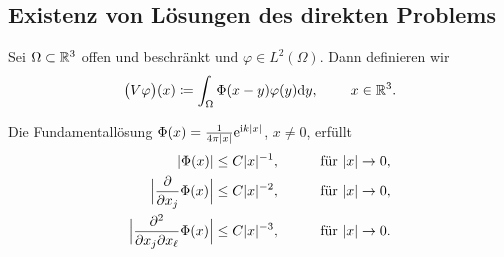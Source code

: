
\subsection{Existenz von Lösungen des direkten Problems}
\renewcommand\thesection{\arabic{section}}
\renewcommand\thesubsection{\arabic{subsection}}
\setcounter{subsection}{4}
\setcounter{section}{4}
\setcounter{mydef}{0}
\setcounter{equation}{0}

\begin{definition}[Volumenpotential]\label{def: volumenpotential}
	Sei \(\Omega\subset\mathbb{R}^3\) offen und beschränkt und \(\varphi\in L^2(\Omega)\). Dann definieren wir 
	\begin{equation}
		\label{volumenpotential def}
		\big(V\varphi\big)(x)\coloneqq\int_\Omega\Phi(x-y)\varphi(y)\mathrm{d}y,\;\qquad x\in\mathbb{R}^3.
	\end{equation}
\end{definition}
\begin{lem}
	Die Fundamentallösung \(\Phi(x)=\frac{1}{4\pi|x|}\mathrm{e}^{\mathrm{i} k|x|}\), \(x\neq0\), erfüllt
	\begin{equation}
		\label{abfall fundamentallösung}
		\begin{aligned}
			|\Phi(x)|&\leq C|x|^{-1},\;\;\qquad\text{ für }|x|\rightarrow0,\\
			\Big|\frac{\partial}{\partial x_j}\Phi(x)\Big|&\leq C|x|^{-2},\;\;\qquad\text{ für }|x|\rightarrow0,\\
			\Big|\frac{\partial^2}{\partial x_j\partial x_\ell}\Phi(x)\Big|&\leq C|x|^{-3},\;\;\qquad\text{ für }|x|\rightarrow0.
		\end{aligned}
	\end{equation}
\end{lem}
